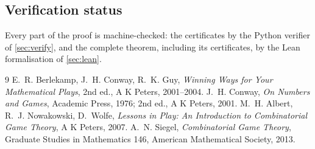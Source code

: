 \documentclass[11pt]{amsart}
\theoremstyle{definition}
\begin{document}
\subsection*{Verification status}
Every part of the proof is machine-checked: the certificates by the Python
verifier of \cref{sec:verify}, and the complete theorem, including its
certificates, by the Lean formalisation of \cref{sec:lean}.

\begin{thebibliography}{9}
 E.~R. Berlekamp, J.~H. Conway, R.~K. Guy,
\emph{Winning Ways for Your Mathematical Plays}, 2nd ed., A K Peters, 2001--2004.
 J.~H. Conway, \emph{On Numbers and Games}, Academic Press,
1976; 2nd ed., A K Peters, 2001.
 M.~H. Albert, R.~J. Nowakowski, D.~Wolfe, \emph{Lessons in
Play: An Introduction to Combinatorial Game Theory}, A K Peters, 2007.
 A.~N. Siegel, \emph{Combinatorial Game Theory}, Graduate
Studies in Mathematics 146, American Mathematical Society, 2013.
\end{thebibliography}
\end{document}
